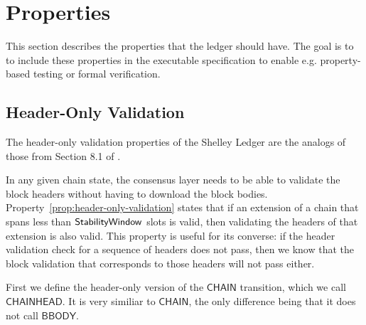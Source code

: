 \newcommand{\Val}{\fun{Val}}
\newcommand{\POV}[1]{\ensuremath{\mathsf{PresOfVal}(\mathsf{#1})}}
\newcommand{\DBE}[2]{\ensuremath{\mathsf{DBE}({#1},~{#2})}}
\newcommand{\DGO}[2]{\ensuremath{\mathsf{DGO}({#1},~{#2})}}
\newcommand{\transtar}[2]{\xlongrightarrow[\textsc{#1}]{#2}\negthickspace^{*}}

\section{Properties}
\label{sec:properties}

This section describes the properties that the ledger should have. The goal is to
to include these properties in the executable specification to enable e.g.
property-based testing or formal verification.

%

\subsection{Header-Only Validation}
\label{sec:header-only-validation}
The header-only validation properties of the Shelley Ledger are the analogs
of those from Section 8.1 of \cite{byron_chain_spec}.

In any given chain state, the consensus layer needs to be able to validate the
block headers without having to download the block bodies.
Property~\ref{prop:header-only-validation} states that if an extension of a
chain that spans less than $\mathsf{StabilityWindow}$ slots is valid, then validating the
headers of that extension is also valid. This property is useful for its
converse: if the header validation check for a sequence of headers does not
pass, then we know that the block validation that corresponds to those headers
will not pass either.

First we define the header-only version of the $\mathsf{CHAIN}$ transition,
which we call $\mathsf{CHAINHEAD}$.
It is very similiar to $\mathsf{CHAIN}$, the only difference being that
it does not call $\mathsf{BBODY}$.

